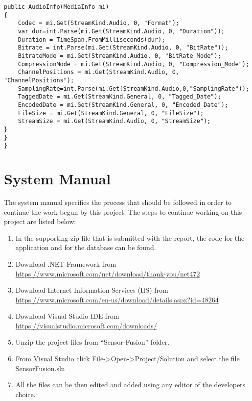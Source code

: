 \begin{lstlisting}
public AudioInfo(MediaInfo mi)
{
	Codec = mi.Get(StreamKind.Audio, 0, "Format");
	var dur=int.Parse(mi.Get(StreamKind.Audio, 0, "Duration"));
	Duration = TimeSpan.FromMilliseconds(dur);
	Bitrate = int.Parse(mi.Get(StreamKind.Audio, 0, "BitRate"));
	BitrateMode = mi.Get(StreamKind.Audio, 0, "BitRate_Mode");
	CompressionMode = mi.Get(StreamKind.Audio, 0, "Compression_Mode");
	ChannelPositions = mi.Get(StreamKind.Audio, 0, "ChannelPositions");
	SamplingRate=int.Parse(mi.Get(StreamKind.Audio,0,"SamplingRate"));
	TaggedDate = mi.Get(StreamKind.General, 0, "Tagged_Date");
	EncodedDate = mi.Get(StreamKind.General, 0, "Encoded_Date");
	FileSize = mi.Get(StreamKind.General, 0, "FileSize");
	StreamSize = mi.Get(StreamKind.Audio, 0, "StreamSize");
}
}
}
\end{lstlisting}


\chapter{System Manual}
\label{app:system_manual}

The system manual specifies the process that should be followed in order to continue the work begun by this project. The steps to continue working on this project are listed below:

\begin{enumerate} 
\item In the supporting zip file that is submitted with the report, the code for the application and for the database can be found.
\item Download .NET Framework from \url{https://www.microsoft.com/net/download/thank-you/net472}
\item  Download Internet Information Services (IIS) from \url{https://www.microsoft.com/en-us/download/details.aspx?id=48264}
\item Download Visual Studio IDE from \url{https://visualstudio.microsoft.com/downloads/}
\item Unzip the project files from ``Sensor-Fusion'' folder.
\item From Visual Studio click File->Open->Project/Solution and select the file SensorFusion.sln
\item All the files can be then edited and added using any editor of the developers choice.





  
\end{enumerate}

